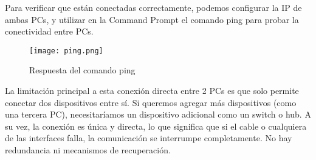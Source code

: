 \documentclass{article}
\begin{document}
Para verificar que están conectadas correctamente, podemos configurar la IP de ambas PCs, y utilizar en la Command Prompt el comando ping para probar la conectividad entre PCs.
\begin{figure}[h]
  \centering
  \texttt{[image: ping.png]}
  \caption{Respuesta del comando ping}
\end{figure}

La limitación principal a esta conexión directa entre 2 PCs es que solo permite conectar dos dispositivos entre sí. Si queremos agregar más dispositivos (como una tercera PC), necesitaríamos un dispositivo adicional como un switch o hub. A su vez, la conexión es única y directa, lo que significa que si el cable o cualquiera de las interfaces falla, la comunicación se interrumpe completamente. No hay redundancia ni mecanismos de recuperación.
\end{document}
